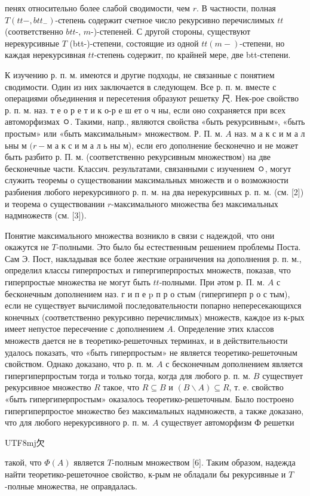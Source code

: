 \documentclass[10pt]{article}
\begin{document}
пенях относительно более слабой сводимости, чем $r$. В частности, полная $T\left(t t-, b t t_{-}\right)$-степень содержит счетное число рекурсивно перечислимых $t t$ (соответственно $b t t$-, $m$-)-степеней. С другой стороны, существуют нерекурсивные $T$ (btt-)-степени, состоящие из одной $t t(m-)$-степени, но каждая нерекурсивная $t t$-степень содержит, по крайней мере, две btt-степени.



К изучению р. п. м. имеются и другие подходы, не связанные с понятием сводимости. Один из них заключается в следующем. Все р. п. м. вместе с операциями объединения и пересетения образуют решетку $\mathscr{尺}$. Нек-рое свойство р. п. м. наз. т е о р е т и к о-р е ш ет о ч ны, если оно сохраняется при всех автоморфизмах ㅇ. Такими, напр., являются свойства «быть рекурсивным», «быть простым» или «быть максимальным» множеством. Р. П. м. $A$ наз. м а к с и м а л ьны м $(r-м$ а к с и м а л ь ны м), если его дополнение бесконечно и не может быть разбито р. П. м. (соответственно рекурсивным множеством) на две бесконечные части. Классич. результатами, связанными с изучением ㅇ, могут служить теоремы о существовании максимальных множеств и о возможности разбиения любого нерекурсивного р. п. м. на два нерекурсивных р. п. м. (см. [2]) и теорема о существовании $r$-максимального множества без максимальных надмножеств (см. [3]).



Понятие максимального множества возникло в связи с надеждой, что они окажутся не $T$-полными. Это было бы естественным решением проблемы Поста. Сам Э. Пост, накладывая все более жесткие ограничения на дополнения р. п. м., определил классы гиперпростых и гипергиперпростых множеств, показав, что гиперпростые множества не могут быть $t t$-полными. При әтом р. П. м. $A$ с бесконечным дополнением наз. г и п е $\mathrm{p}$ п р о стым (гипергиперп р о с тым), если не существует вычислимой последовательности попарно непересекающихся конечных (соответственно рекурсивно перечислимых) множеств, каждое из к-рых имеет непустое пересечение с дополнением $A$. Определение этих классов множеств дается не в теоретико-решеточных терминах, и в действительности удалось показать, что «быть гиперпростым» не является теоретико-решеточным свойством. Однако доказано, что р. п. м. $A$ с бесконечным дополнением является гипергиперпростым тогда и только тогда, когда для любого р. п. м. $B$ существует рекурсивное множество $R$ такое, что $R \subseteq B$ и $(B \backslash A) \subseteq R$, т. е. свойство «быть гипергиперпростым» оказалось теоретико-решеточным. Было построено гипергиперпростое множество без максимальных надмножеств, а также доказано, что для любого нерекурсивного р. п. м. $A$ существует автоморфизм Ф решетки \begin{CJK}{UTF8}{mj}欠\end{CJK} такой, что $\Phi(A)$ является $T$-полным множеством [6]. Таким образом, надежда найти теоретико-решеточное свойство, к-рым не обладали бы рекурсивные и $T$-полные множества, не оправдалась.
\end{document}
